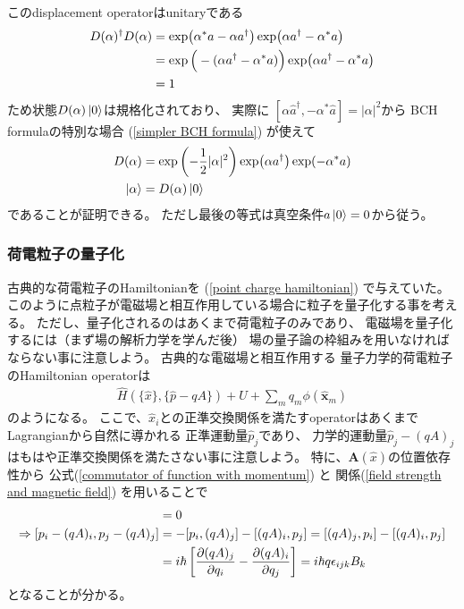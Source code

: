 このdisplacement operatorはunitaryである
\begin{align}
    D(\alpha)^\dagger D(\alpha) &=
    \exp(
        \alpha^* \hat{a}
        - \alpha \hat{a}^\dagger
    )
    \exp(
        \alpha\hat{a}^\dagger
        - \alpha^* \hat{a}
    )
\notag\\&=
    \exp\Big(
        - (
        \alpha \hat{a}^\dagger
        -
        \alpha^* \hat{a}
        )
    \Big)
    \exp(
        \alpha\hat{a}^\dagger
        - \alpha^* \hat{a}
    )
\notag\\&=
    1
\end{align}
ため状態$D(\alpha)\ket{0}$は規格化されており、
実際に
$[
    \alpha \hat{a}^\dagger,
     - \alpha^* \hat{a}
]
= |\alpha|^2$から
BCH formulaの特別な場合
(\ref{simpler BCH formula})
が使えて
\begin{align}
    D(\alpha) &= \exp\left(
        - \dfrac{1}{2}|\alpha|^2
    \right)
    \exp(\alpha \hat{a}^\dagger)
    \exp( - \alpha^* \hat{a})
\notag\\
    \ket{\alpha} &= D(\alpha) \ket{0}
\end{align}
であることが証明できる。
ただし最後の等式は真空条件$\hat{a}\ket{0}=0$から従う。

\subsubsection{荷電粒子の量子化}

古典的な荷電粒子のHamiltonianを
(\ref{point charge hamiltonian})
で与えていた。
このように点粒子が電磁場と相互作用している場合に粒子を量子化する事を考える。
ただし、量子化されるのはあくまで荷電粒子のみであり、
電磁場を量子化するには（まず場の解析力学を学んだ後）
場の量子論の枠組みを用いなければならない事に注意しよう。
古典的な電磁場と相互作用する
量子力学的荷電粒子のHamiltonian operatorは
\begin{align}
    \hat{H}(\{\hat{x}\},\{\hat{p} - qA\})
  +
    U
  +
  \sum_m
    q_m
    \phi(\hat{\bm{x}}_m)
\label{hamiltonian of quantum mechanical point charge}
\end{align}
のようになる。
ここで、$\hat{x}_i$との正準交換関係を満たすoperatorはあくまで
Lagrangianから自然に導かれる
正準運動量$\hat{p}_j$であり、
力学的運動量$\hat{p}_j - (qA)_j$はもはや正準交換関係を満たさない事に注意しよう。
特に、$\bm{A}(\hat{x})$の位置依存性から
公式(\ref{commutator of function with momentum})
と
関係(\ref{field strength and magnetic field})
を用いることで
\begin{align}
    [\hat{p}_i, \hat{p}_j] &= 0
\notag\\
\Rightarrow
    [\hat{p}_i - (qA)_i,
    \hat{p}_j - (qA)_j]
&=
    - [\hat{p}_i, (qA)_j]
    - [(qA)_i, \hat{p}_j]
=
    [(qA)_j, \hat{p}_i]
    - [(qA)_i, \hat{p}_j]
\notag\\&
=
    i \hbar
    \left[
        \dfrac{ \partial (qA)_j}
        {\partial q_i}
    -
        \dfrac{ \partial (qA)_i}
        {\partial q_j}
    \right]
= i \hbar q \epsilon_{ijk} B_k
\end{align}
となることが分かる。

